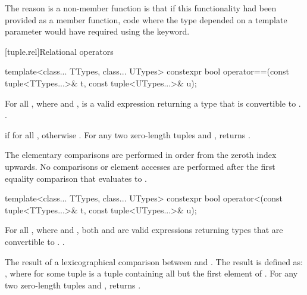 \pnum
\begin{note} The reason  is a
non-member function is that if this functionality had been
provided as a member function, code where the type
depended on a template parameter would have required using
the  keyword. \end{note}

[tuple.rel]{Relational operators}

%
\begin{itemdecl}
template<class... TTypes, class... UTypes>
  constexpr bool operator==(const tuple<TTypes...>& t, const tuple<UTypes...>& u);
\end{itemdecl}

\begin{itemdescr}
\pnum
\requires  For all ,
where  and
,  is a valid expression
returning a type that is convertible to .
 \tcode{==}
.

\pnum
\returns  {} if  for all
, otherwise .
For any two zero-length tuples  and ,  returns .

\pnum
\effects  The elementary comparisons are performed in order from the
zeroth index upwards.  No comparisons or element accesses are
performed after the first equality comparison that evaluates to
.
\end{itemdescr}

%
\begin{itemdecl}
template<class... TTypes, class... UTypes>
  constexpr bool operator<(const tuple<TTypes...>& t, const tuple<UTypes...>& u);
\end{itemdecl}

\begin{itemdescr}
\pnum
\requires  For all ,
where  and
, both 
and 
are valid expressions returning types that are
convertible to .
 \tcode{==}
.

\pnum\returns  The result of a lexicographical comparison
between  and . The result is defined
as: , where  for some
tuple  is a tuple containing all but the first element
of .  For any two zero-length tuples 
and ,  returns .
\end{itemdescr}

